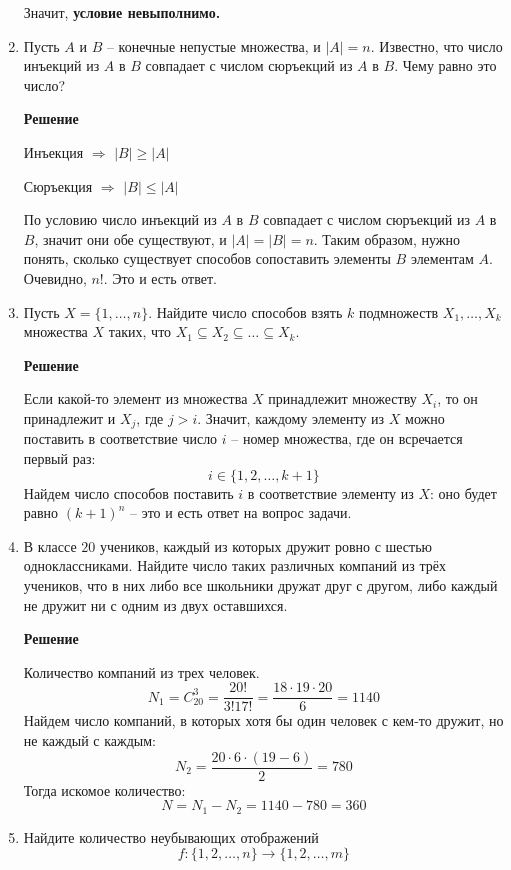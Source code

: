 \documentclass[12pt]{article}
\begin{document}
\begin{enumerate}[label={\textbf{\arabic{section}.\arabic*}}]
		Значит, \textbf{условие невыполнимо.}
		
		\item Пусть $A$ и $B$ -- конечные непустые множества, и $|A| = n$. Известно, что число инъекций из $A$ в $B$ совпадает с числом сюръекций из $A$ в $B$. Чему равно это число?
		
		\textbf{Решение}
		
		Инъекция $\Rightarrow$ $|B|\geq|A|$
		
		Сюръекция $\Rightarrow$ $|B|\leq|A|$
		
		По условию число инъекций из $A$ в $B$ совпадает с числом сюръекций из $A$ в $B$, значит они обе существуют, и $|A| = |B| = n$. Таким образом, нужно понять, сколько существует способов сопоставить элементы $B$ элементам $A$. Очевидно, $n!$. Это и есть ответ.
		
		\item Пусть $X = \{1,\dots, n\}$. Найдите число способов взять $k$ подмножеств $X_1,\dots,X_k$ множества $X$ таких, что $X_1\subseteq X_2\subseteq\dots\subseteq X_k$.
		
		\textbf{Решение}
		
		Если какой-то элемент из множества $X$ принадлежит множеству $X_i$, то он принадлежит и $X_j$, где $j > i$. Значит, каждому элементу из $X$ можно поставить в соответствие число $i$ -- номер множества, где он всречается первый раз:
		$$
		i\in\{1,2,\dots,k+1\}
		$$
		Найдем число способов поставить $i$ в соответствие элементу из $X$: оно будет равно $(k+1)^n$ -- это и есть ответ на вопрос задачи.  
		
		\item В классе $20$ учеников, каждый из которых дружит ровно с шестью одноклассниками. Найдите число таких различных компаний из трёх учеников, что в них либо все школьники дружат друг с другом, либо каждый не дружит ни с одним из двух оставшихся.
		
		\textbf{Решение}
		
		Количество компаний из трех человек.
		$$
		N_1 = C_{20}^3 = \frac{20!}{3!17!} = \frac{18\cdot19\cdot20}{6} = 1140
		$$
		Найдем число компаний, в которых хотя бы один человек с кем-то дружит, но не каждый с каждым:
		$$
		N_2 = \frac{20\cdot6\cdot(19-6)}{2} = 780
		$$
		Тогда искомое количество:
		$$
		N = N_1 - N_2 = 1140 - 780 = 360
		$$
		
		\item Найдите количество неубывающих отображений
		$$
		f:\{1,2,\dots,n\}\rightarrow\{1,2,\dots,m\}
		$$
		

\end{enumerate}
\end{document}
